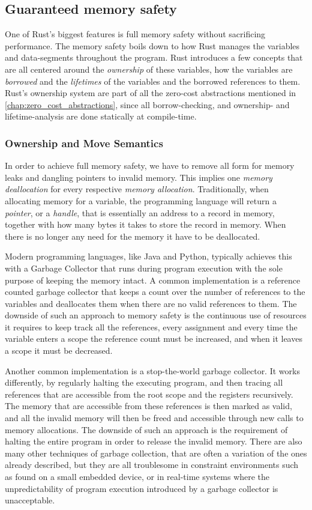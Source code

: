 \subsection{Guaranteed memory safety}

One of Rust's biggest features is full memory safety \cite{web:rust_book_unsafe} without sacrificing performance.
The memory safety boils down to how Rust manages the variables and data-segments throughout the program.
Rust introduces a few concepts that are all centered around the \emph{ownership} of these variables, how the variables are \emph{borrowed} and the \emph{lifetimes} of the variables and the borrowed references to them.
Rust's ownership system are part of all the zero-cost abstractions mentioned in \autoref{chap:zero_cost_abstractions}, since all borrow-checking, and ownership- and lifetime-analysis are done statically at compile-time.

\subsubsection{Ownership and Move Semantics}

In order to achieve full memory safety, we have to remove all form for memory leaks and dangling pointers to invalid memory.
This implies one \emph{memory deallocation} for every respective \emph{memory allocation}.
Traditionally, when allocating memory for a variable, the programming language will return a \emph{pointer},  or a \emph{handle}, that is essentially an address to a record in memory, together with how many bytes it takes to store the record in memory.
When there is no longer any need for the memory it have to be deallocated.

Modern programming languages, like Java and Python, typically achieves this with a Garbage Collector that runs during program execution with the sole purpose of keeping the memory intact.
A common implementation is a reference counted garbage collector that keeps a count over the number of references to the variables and deallocates them when there are no valid references to them.
The downside of such an approach to memory safety is the continuous use of resources it requires to keep track all the references, every assignment and every time the variable enters a scope the reference count must be increased, and when it leaves a scope it must be decreased.

Another common implementation is a stop-the-world garbage collector.
It works differently, by regularly halting the executing program, and then tracing all references that are accessible from the root scope and the registers recursively.
The memory that are accessible from these references is then marked as valid, and all the invalid memory will then be freed and accessible through new calls to memory allocations.
The downside of such an approach is the requirement of halting the entire program in order to release the invalid memory.
There are also many other techniques of garbage collection, that are often a variation of the ones already described, but they are all troublesome in constraint environments such as found on a small embedded device, or in real-time systems where the unpredictability of program execution introduced by a garbage collector is unacceptable.

